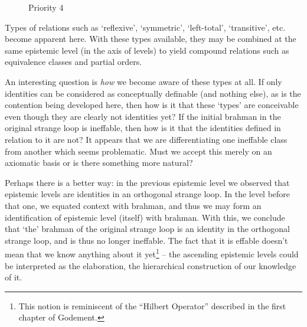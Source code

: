 \documentclass[pra,twocolumn,groupedaddress,10pt]{revtex4}
\theoremstyle{definition}
\begin{document}
\begin{enumerate}[label={[\textbf{\arabic*}]},start=0]
\begin{figure}[htp]
			\caption{\label{fig:epipri4}Priority 4}
		\end{figure}

		Types of relations such as `reflexive', `symmetric', `left-total', `transitive', etc. become apparent here. With these types available, they may be combined at the same epistemic level (in the axis of levels) to yield compound relations such as equivalence classes and partial orders.

		An interesting question is \emph{how} we become aware of these types at all. If only identities can be considered as conceptually definable (and nothing else), as is the contention being developed here, then how is it that these `types' are conceivable even though they are clearly not identities yet? If the initial brahman in the original strange loop is ineffable, then how is it that the identities defined in relation to it are not? It appears that we are differentiating one ineffable class from another which seems problematic. Must we accept this merely on an axiomatic basis or is there something more natural?

		Perhaps there is a better way: in the previous epistemic level we observed that epistemic levels are identities in an orthogonal strange loop. In the level before that one, we equated context with brahman, and thus we may form an identification of epistemic level (itself) with brahman. With this, we conclude that `the' brahman of the original strange loop is an identity in the orthogonal strange loop, and is thus no longer ineffable. The fact that it is effable doesn't mean that we know anything about it yet\footnote{This notion is reminiscent of the ``Hilbert Operator'' described in the first chapter of Godement\cite{godement}.} -- the ascending epistemic levels could be interpreted as the elaboration, the hierarchical construction of our knowledge of it.


\end{enumerate}
\end{document}
